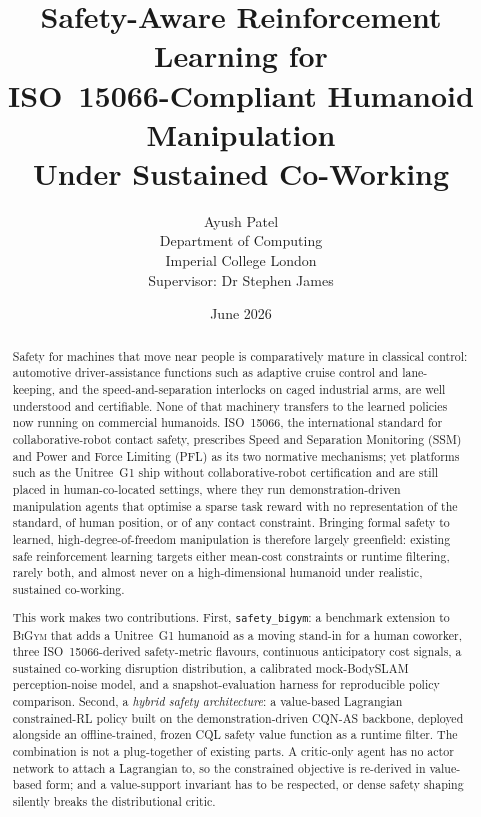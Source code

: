 \documentclass[11pt,a4paper]{report}
\title{Safety-Aware Reinforcement Learning for\\
       ISO~15066-Compliant Humanoid Manipulation\\
       Under Sustained Co-Working}
\author{Ayush Patel \\
        Department of Computing \\
        Imperial College London \\[1ex]
        Supervisor: Dr Stephen James}
\date{June 2026}
\newcommand{\ssm}{SSM}
\newcommand{\pfl}{PFL}
\newcommand{\iso}{ISO~15066}
\newcommand{\bigym}{\textsc{BiGym}}
\newcommand{\sbigym}{\texttt{safety\_bigym}}
\newcommand{\cqnas}{CQN-AS}
\newcommand{\bodyslampp}{BodySLAM\nolinebreak[4]\hspace{-.05em}\raisebox{.2ex}{\scriptsize ++}}
\begin{document}

\maketitle

\begin{abstract}
\noindent
Safety for machines that move near people is comparatively mature
in classical control: automotive driver-assistance functions such as
adaptive cruise control and lane-keeping, and the speed-and-separation
interlocks on caged industrial arms, are well understood and
certifiable. None of that machinery transfers to the learned policies
now running on commercial humanoids. \iso{}, the international
standard for collaborative-robot contact safety, prescribes Speed and
Separation Monitoring (\ssm{}) and Power and Force Limiting (\pfl{})
as its two normative mechanisms; yet platforms such as the Unitree~G1
ship without collaborative-robot certification and are still placed in
human-co-located settings, where they run demonstration-driven
manipulation agents that optimise a sparse task reward with no
representation of the standard, of human position, or of any contact
constraint. Bringing formal safety to learned, high-degree-of-freedom
manipulation is therefore largely greenfield: existing safe
reinforcement learning targets either mean-cost constraints or runtime
filtering, rarely both, and almost never on a high-dimensional
humanoid under realistic, sustained co-working.

This work makes two contributions. First, \sbigym{}: a benchmark
extension to \bigym{} that adds a Unitree~G1 humanoid as a moving
stand-in for a human coworker, three \iso{}-derived safety-metric
flavours, continuous anticipatory cost signals, a sustained
co-working disruption distribution, a calibrated mock-\bodyslampp{}
perception-noise model, and a snapshot-evaluation harness for
reproducible policy comparison. Second, a \emph{hybrid safety
architecture}: a value-based Lagrangian constrained-RL policy built
on the demonstration-driven \cqnas{} backbone, deployed alongside an
offline-trained, frozen \textsc{CQL} safety value function as a
runtime filter. The combination is not a plug-together of existing
parts. A critic-only agent has no actor network to attach a
Lagrangian to, so the constrained objective is re-derived in
value-based form; and a value-support invariant has to be respected,
or dense safety shaping silently breaks the distributional critic.


\end{abstract}
\end{document}
